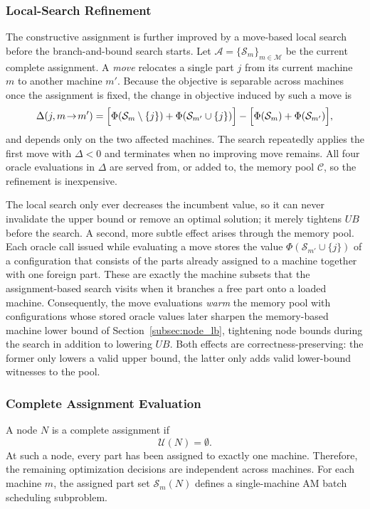 \documentclass[review,3p,times,authoryear]{elsarticle}
\begin{document}
\subsubsection{Local-Search Refinement}
\label{subsubsec:ls_refine}

The constructive assignment is further improved by a move-based local search
before the branch-and-bound search starts. Let
$\mathcal{A}=\{\mathcal{S}_m\}_{m\in\mathcal{M}}$ be the current complete
assignment. A \emph{move} relocates a single part $j$ from its current machine
$m$ to another machine $m'$. Because the objective is separable across machines
once the assignment is fixed, the change in objective induced by such a move is
\[
\Delta(j,m\!\to\!m')
=
\Bigl[\Phi(\mathcal{S}_m\setminus\{j\})+\Phi(\mathcal{S}_{m'}\cup\{j\})\Bigr]
-
\Bigl[\Phi(\mathcal{S}_m)+\Phi(\mathcal{S}_{m'})\Bigr],
\]
and depends only on the two affected machines. The search repeatedly applies the
first move with $\Delta<0$ and terminates when no improving move remains. All
four oracle evaluations in $\Delta$ are served from, or added to, the memory
pool $\mathcal{C}$, so the refinement is inexpensive.

The local search only ever decreases the incumbent value, so it can never
invalidate the upper bound or remove an optimal solution; it merely tightens
$UB$ before the search. A second, more subtle effect arises through the memory
pool. Each oracle call issued while evaluating a move stores the value
$\Phi(\mathcal{S}_{m'}\cup\{j\})$ of a configuration that consists of the parts
already assigned to a machine together with one foreign part. These are exactly
the machine subsets that the assignment-based search visits when it branches a
free part onto a loaded machine. Consequently, the move evaluations
\emph{warm} the memory pool with configurations whose stored oracle values
later sharpen the memory-based machine lower bound of
Section~\ref{subsec:node_lb}, tightening node bounds during the search in
addition to lowering $UB$. Both effects are correctness-preserving: the former
only lowers a valid upper bound, the latter only adds valid lower-bound
witnesses to the pool.

\subsubsection{Complete Assignment Evaluation}

A node $N$ is a complete assignment if
\[
\mathcal{U}(N)=\emptyset.
\]
At such a node, every part has been assigned to exactly one machine.
Therefore, the remaining optimization decisions are independent across
machines. For each machine $m$, the assigned part set
$\mathcal{S}_m(N)$ defines a single-machine AM batch scheduling subproblem.
\end{document}
